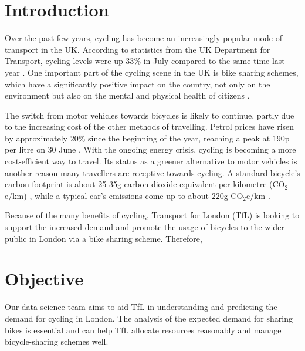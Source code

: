 \section{Introduction}
Over the past few years, cycling has become an increasingly popular mode of transport in the UK. According to statistics from the UK Department for Transport, cycling levels were up 33$\%$ in July compared to the same time last year \cite{dftstat}. One important part of the cycling scene in the UK is bike sharing schemes, which have a significantly positive impact on the country, not only on the environment but also on the mental and physical health of citizens \cite{nationalimapct}.

The switch from motor vehicles towards bicycles is likely to continue, partly due to the increasing cost of the other methods of travelling. Petrol prices have risen by approximately 20$\%$ since the beginning of the year, reaching a peak at 190p per litre on 30 June \cite{petrol}. With the ongoing energy crisis, cycling is becoming a more cost-efficient way to travel. Its status as a greener alternative to motor vehicles is another reason many travellers are receptive towards cycling. A standard bicycle's carbon footprint is about 25-35g carbon dioxide equivalent per kilometre (CO$_2$e/km) \cite{cycleco2}, while a typical car's emissions come up to about 220g CO$_2$e/km \cite{carco2}. 

Because of the many benefits of cycling, Transport for London (TfL) is looking to support the increased demand and promote the usage of bicycles to the wider public in London via a bike sharing scheme. Therefore, 


\section{Objective}
Our data science team aims to aid TfL in understanding and predicting the demand for cycling in London. The analysis of the expected demand for sharing bikes is essential and can help TfL allocate resources reasonably and manage bicycle-sharing schemes well.


